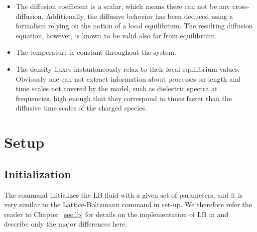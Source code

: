 \begin{itemize}
\item The diffusion coefficient is a scalar, which means there can not
  be any cross-diffusion. Additionally, the diffusive behavior has
  been deduced using a formalism relying on the notion of a local
  equilibrium. The resulting diffusion equation, however, is known to
  be valid also far from equilibrium.
	
\item The temperature is constant throughout the system.
	
\item The density fluxes instantaneously relax to their local
  equilibrium values. Obviously one can not extract information about
  processes on length and time scales not covered by the model, such
  as dielectric spectra at frequencies, high enough that they
  correspond to times faster than the diffusive time scales of the
  charged species.
\end{itemize}

\section{Setup}

\subsection{\label{ssec:ek-init}Initialization}

\begin{essyntax}
  \begin{features}
  \end{features}
\end{essyntax}
The  command initializes the LB fluid with a given
set of parameters, and it is very similar to the \es{} Lattice-Boltzmann 
 command in set-up. We therefore refer the reader to 
Chapter~\ref{sec:lb} for details on the implementation of LB in \es{} and 
describe only the major differences here. 

